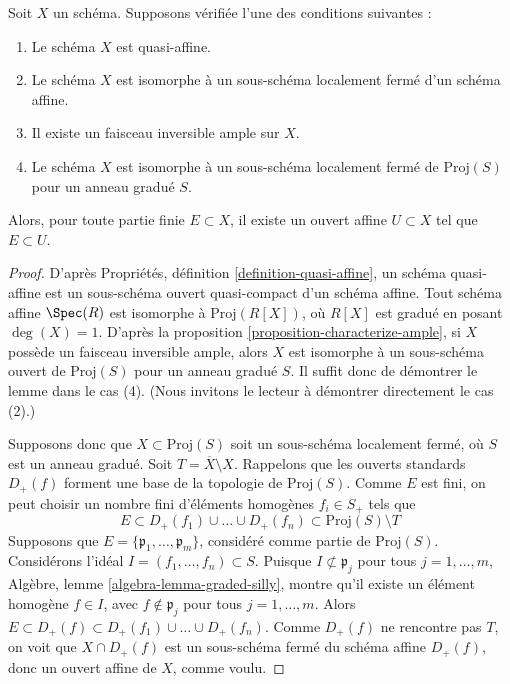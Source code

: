 \begin{lemma}
\label{lemma-ample-finite-set-in-affine}
Soit $X$ un schéma. Supposons vérifiée l'une des conditions suivantes :
\begin{enumerate}
\item Le schéma $X$ est quasi-affine.
\item Le schéma $X$ est isomorphe à un sous-schéma localement fermé
d'un schéma affine.
\item Il existe un faisceau inversible ample sur $X$.
\item Le schéma $X$ est isomorphe à un sous-schéma localement fermé
de $\text{Proj}(S)$ pour un anneau gradué $S$.
\end{enumerate}
Alors, pour toute partie finie $E \subset X$, il existe un
ouvert affine $U \subset X$ tel que $E \subset U$.
\end{lemma}

\begin{proof}
D'après Propriétés, définition \ref{definition-quasi-affine},
un schéma quasi-affine est un sous-schéma ouvert quasi-compact
d'un schéma affine. Tout schéma affine $\Spec(R)$ est isomorphe à
$\text{Proj}(R[X])$, où $R[X]$ est gradué en posant $\deg(X) = 1$.
D'après la proposition \ref{proposition-characterize-ample},
si $X$ possède un faisceau inversible ample, alors $X$ est isomorphe à un
sous-schéma ouvert de $\text{Proj}(S)$ pour un anneau gradué $S$.
Il suffit donc de démontrer le lemme dans le cas (4).
(Nous invitons le lecteur à démontrer directement le cas (2).)

\medskip\noindent
Supposons donc que $X \subset \text{Proj}(S)$ soit un sous-schéma localement fermé,
où $S$ est un anneau gradué. Soit $T = \overline{X} \setminus X$.
Rappelons que les ouverts standards $D_{+}(f)$ forment une base de la
topologie de $\text{Proj}(S)$. Comme $E$ est fini, on peut choisir un nombre fini
d'éléments homogènes $f_i \in S_{+}$ tels que
$$
E \subset
D_{+}(f_1) \cup \ldots \cup D_{+}(f_n) \subset
\text{Proj}(S) \setminus T
$$
Supposons que $E = \{\mathfrak p_1, \ldots, \mathfrak p_m\}$,
considéré comme partie de $\text{Proj}(S)$.
Considérons l'idéal $I = (f_1, \ldots, f_n) \subset S$.
Puisque $I \not \subset \mathfrak p_j$ pour tous $j = 1, \ldots, m$,
Algèbre, lemme \ref{algebra-lemma-graded-silly}, montre qu'il
existe un élément homogène $f \in I$, avec $f \not \in \mathfrak p_j$
pour tous $j = 1, \ldots, m$. Alors $E \subset D_{+}(f) \subset
D_{+}(f_1) \cup \ldots \cup D_{+}(f_n)$. Comme $D_{+}(f)$ ne
rencontre pas $T$, on voit que $X \cap D_{+}(f)$ est un sous-schéma fermé du
schéma affine $D_{+}(f)$, donc un ouvert affine de $X$, comme voulu.
\end{proof}

